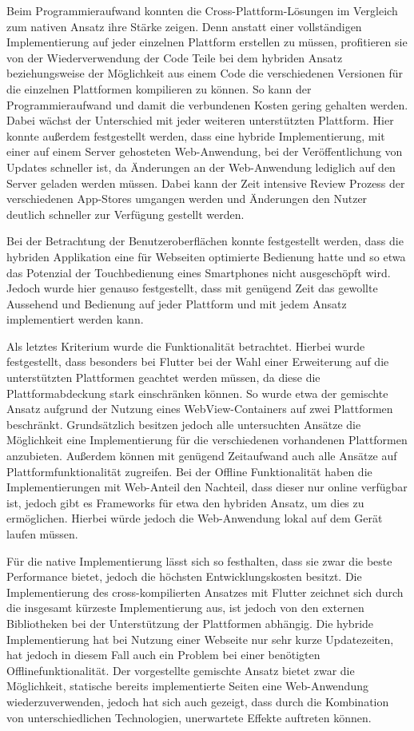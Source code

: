 Beim Programmieraufwand konnten die Cross-Plattform-Lösungen im Vergleich zum nativen Ansatz ihre Stärke zeigen. Denn anstatt einer vollständigen Implementierung auf jeder einzelnen Plattform erstellen zu müssen, profitieren sie von der Wiederverwendung der Code Teile bei dem hybriden Ansatz beziehungsweise der Möglichkeit aus einem Code die verschiedenen Versionen für die einzelnen Plattformen kompilieren zu können. So kann der Programmieraufwand und damit die verbundenen Kosten gering gehalten werden. Dabei wächst der Unterschied mit jeder weiteren unterstützten Plattform.
Hier konnte außerdem festgestellt werden, dass eine hybride Implementierung, mit einer auf einem Server gehosteten Web-Anwendung, bei der Veröffentlichung von Updates schneller ist, da Änderungen an der Web-Anwendung lediglich auf den Server geladen werden müssen. Dabei kann der Zeit intensive Review Prozess der verschiedenen App-Stores umgangen werden und Änderungen den Nutzer deutlich schneller zur Verfügung gestellt werden.

Bei der Betrachtung der Benutzeroberflächen konnte festgestellt werden, dass die hybriden Applikation eine für Webseiten optimierte Bedienung hatte und so etwa das Potenzial der Touchbedienung eines Smartphones nicht ausgeschöpft wird. Jedoch wurde hier genauso festgestellt, dass mit genügend Zeit das gewollte Aussehend und Bedienung auf jeder Plattform und mit jedem Ansatz implementiert werden kann.

Als letztes Kriterium wurde die Funktionalität betrachtet. Hierbei wurde festgestellt, dass besonders bei Flutter bei der Wahl einer Erweiterung auf die unterstützten Plattformen geachtet werden müssen, da diese die Plattformabdeckung stark einschränken können. So wurde etwa der gemischte Ansatz aufgrund der Nutzung eines WebView-Containers auf zwei Plattformen beschränkt. Grundsätzlich besitzen jedoch alle untersuchten Ansätze die Möglichkeit eine Implementierung für die verschiedenen vorhandenen Plattformen anzubieten. Außerdem können mit genügend Zeitaufwand auch alle Ansätze auf Plattformfunktionalität  zugreifen. Bei der Offline Funktionalität haben die Implementierungen mit Web-Anteil den Nachteil, dass dieser nur online verfügbar ist, jedoch gibt es Frameworks für etwa den hybriden Ansatz, um dies zu ermöglichen. Hierbei würde jedoch die Web-Anwendung lokal auf dem Gerät laufen müssen.

Für die native Implementierung lässt sich so festhalten, dass sie zwar die beste Performance bietet, jedoch die höchsten Entwicklungskosten besitzt.
Die Implementierung des cross-kompilierten Ansatzes mit Flutter zeichnet sich durch die insgesamt kürzeste Implementierung aus, ist jedoch von den externen Bibliotheken bei der Unterstützung der Plattformen abhängig. Die hybride Implementierung hat bei Nutzung einer Webseite nur sehr kurze Updatezeiten, hat jedoch in diesem Fall auch ein Problem bei einer benötigten Offlinefunktionalität. Der vorgestellte gemischte Ansatz bietet zwar die Möglichkeit, statische bereits implementierte Seiten eine Web-Anwendung wiederzuverwenden, jedoch hat sich auch gezeigt, dass durch die Kombination von unterschiedlichen Technologien, unerwartete Effekte auftreten können.

